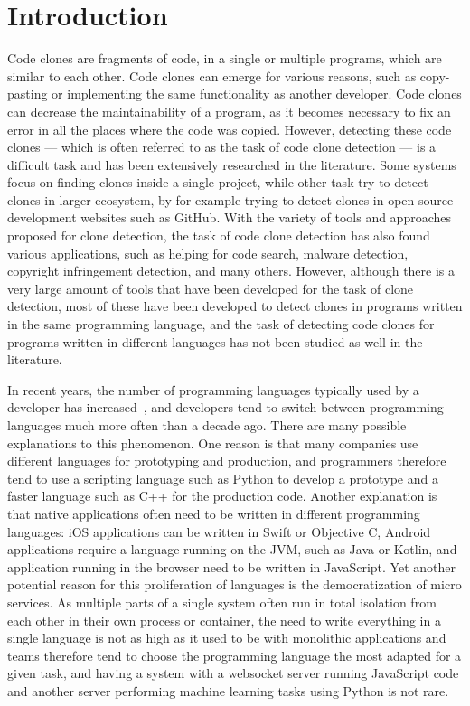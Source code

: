 \chapter{Introduction}

Code clones are fragments of code, in a single or multiple programs, which are
similar to each other. Code clones can emerge for various reasons, such as
copy-pasting or implementing the same functionality as another developer. Code
clones can decrease the maintainability of a program, as it becomes necessary to
fix an error in all the places where the code was copied. However, detecting
these code clones --- which is often referred to as the task of code clone
detection --- is a difficult task and has been extensively researched in the
literature. Some systems focus on finding clones inside a single project, while
other task try to detect clones in larger ecosystem, by for example trying to
detect clones in open-source development websites such as GitHub.
With the variety of tools and approaches proposed for clone detection, the task
of code clone detection has also found various applications, such as helping for
code search, malware detection, copyright infringement detection, and many
others. However, although there is a very large amount of tools that have been
developed for the task of clone detection, most of these have been developed to
detect clones in programs written in the same programming language, and the task
of detecting code clones for programs written in different languages has not
been studied as well in the literature.

In recent years, the number of programming languages typically used by a
developer has increased~\cite{programming-languages-over-time}, and developers
tend to switch between programming languages much more often than a decade ago.
There are many possible explanations to this phenomenon. One reason is that many
companies use different languages for prototyping and production, and
programmers therefore tend to use a scripting language such as Python to develop
a prototype and a faster language such as C++ for the production code. Another
explanation is that native applications often need to be written in different
programming languages: iOS applications can be written in Swift or Objective C,
Android applications require a language running on the JVM, such as Java or
Kotlin, and application running in the browser need to be written in JavaScript.
Yet another potential reason for this proliferation of languages is the
democratization of micro services. As multiple parts of a single system often
run in total isolation from each other in their own process or container,
the need to write everything in a single language is not as high as it used to
be with monolithic applications and teams therefore tend to choose the
programming language the most adapted for a given task, and having a system with
a websocket server running JavaScript code and another server performing
machine learning tasks using Python is not rare.

